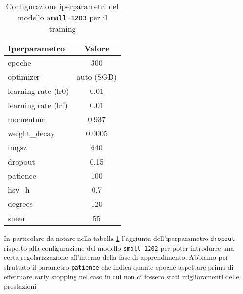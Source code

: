 \begin{table}[h!]
    \centering
    \begin{tabular}{lc}
        \hline
        \textbf{Iperparametro} & \textbf{Valore} \\
        \hline
        epoche & 300  \\
        optimizer & auto (SGD) \\
        learning rate (lr0) & 0.01 \\
        learning rate (lrf) & 0.01 \\
        momentum & 0.937 \\
        weight\_decay & 0.0005 \\
        imgsz & 640 \\
        dropout & 0.15 \\
        patience & 100 \\
        \midrule
        hsv\_h & 0.7 \\
        degrees & 120 \\
        shear & 55 \\
        \hline
    \end{tabular}
    \caption{Configurazione iperparametri del modello \texttt{small-1203} per il training}
    \label{tab:v2-model-configs}
    \end{table}

In particolare da notare nella tabella \ref{tab:v2-model-configs} l'aggiunta dell'iperparametro \texttt{dropout} rispetto alla configurazione
del modello \texttt{small-1202} per poter introdurre una certa regolarizzazione all'interno della fase
di apprendimento. 
Abbiamo poi sfruttato il parametro \texttt{patience} che indica quante epoche aspettare
prima di effettuare early stopping nel caso in cui non ci fossero stati miglioramenti delle prestazioni.

